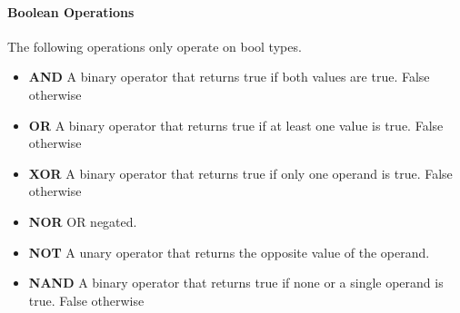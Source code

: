 \paragraph{Boolean Operations}
\label{sec:boolOps}

The following operations only operate on bool types.

\begin{itemize}
  \item \textbf{AND} A binary operator that returns true if both values are true. False otherwise
  \item \textbf{OR} A binary operator that returns true if at least one value is true. False otherwise
  \item \textbf{XOR} A binary operator that returns true if only one operand is true. False otherwise
  \item \textbf{NOR} OR negated.
  \item \textbf{NOT} A unary operator that returns the opposite value of the operand.
  \item \textbf{NAND} A binary operator that returns true if none or a single operand is true. False otherwise
\end{itemize}
